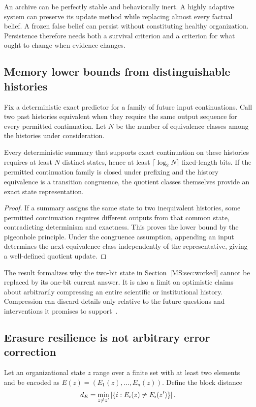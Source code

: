 An archive can be perfectly stable and behaviorally inert. A highly adaptive system can preserve its update method while replacing almost every factual belief. A frozen false belief can persist without constituting healthy organization. Persistence therefore needs both a survival criterion and a criterion for what ought to change when evidence changes.

\subsection{Memory lower bounds from distinguishable histories}
Fix a deterministic exact predictor for a family of future input continuations. Call two past histories equivalent when they require the same output sequence for every permitted continuation. Let $N$ be the number of equivalence classes among the histories under consideration.

\begin{MSproposition}\label{MS:prop:memory}
Every deterministic summary that supports exact continuation on these histories requires at least $N$ distinct states, hence at least $\lceil\log_2N\rceil$ fixed-length bits. If the permitted continuation family is closed under prefixing and the history equivalence is a transition congruence, the quotient classes themselves provide an exact state representation.
\end{MSproposition}
\begin{proof}
If a summary assigns the same state to two inequivalent histories, some permitted continuation requires different outputs from that common state, contradicting determinism and exactness. This proves the lower bound by the pigeonhole principle. Under the congruence assumption, appending an input determines the next equivalence class independently of the representative, giving a well-defined quotient update.
\end{proof}

The result formalizes why the two-bit state in Section~\ref{MS:sec:worked} cannot be replaced by its one-bit current answer. It is also a limit on optimistic claims about arbitrarily compressing an entire scientific or institutional history. Compression can discard details only relative to the future questions and interventions it promises to support~\cite{MS:tishby}.

\subsection{Erasure resilience is not arbitrary error correction}
Let an organizational state $z$ range over a finite set with at least two elements and be encoded as $E(z)=(E_1(z),\ldots,E_n(z))$. Define the block distance
\[
d_E=\min_{z\ne z'}\left\lvert\{i:E_i(z)\ne E_i(z')\}\right\rvert.
\]

